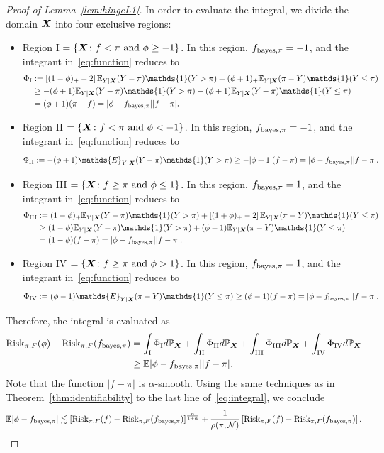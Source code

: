 \documentclass[11pt]{article}
\theoremstyle{plain}
\theoremstyle{definition}
\def\bayespif{f_{\textup{bayes},\pi}}
\def\riskF{\textup{Risk}_{\pi,F}}
\begin{document}
\begin{proof}[Proof of Lemma~\ref{lem:hingeL1}]
In order to evaluate the integral, we divide the domain $\bm X$ into four exclusive regions:
\begin{itemize}
\item Region I $= \{\bm X\colon f<\pi \text{ and }\phi\geq -1\}$. In this region, $\bayespif=-1$, and the integrant in~\eqref{eq:function} reduces to
\begin{align}
\Phi_{\textup{I}}&:=\left[(1-\phi)_{+}-2\right]\mathbb{E}_{Y|\mX}(Y- \pi)\mathds{1}(Y> \pi)+(\phi+1)_{+}\mathbb{E}_{Y|\mX}(\pi-Y)\mathds{1}(Y\leq \pi)\\
&\geq -(\phi+1)\mathbb{E}_{Y|\mX}(Y-\pi)\mathds{1}(Y>\pi)-(\phi+1)\mathbb{E}_{Y|\mX}(Y-\pi)\mathds{1}(Y\leq \pi)\\
&=(\phi+1)(\pi-f)=|\phi-\bayespif||f-\pi|.
\end{align}
\item Region II $= \{\bm X\colon f < \pi \text{ and }\phi<-1\}$. In this region, $\bayespif=-1$, and the integrant in~\eqref{eq:function} reduces to
\[
\Phi_{\textup{II}}:=-(\phi+1)\mathds{E}_{Y|\mX}(Y-\pi)\mathds{1}(Y>\pi)\geq-|\phi+1|(f-\pi) =|\phi-\bayespif||f-\pi|.
\]
\item Region III $=\{ \bm X\colon f\geq \pi \text{ and }\phi\leq 1\}$. In this region, $\bayespif=1$, and the integrant in~\eqref{eq:function} reduces to
\begin{align}
\Phi_{\textup{III}}&:=(1-\phi)_{+}\mathbb{E}_{Y|\mX}(Y-\pi)\mathds{1}(Y>\pi)+\left[(1+\phi)_{+}-2\right]\mathbb{E}_{Y|\mX}(\pi-Y)\mathds{1}(Y\leq \pi)\\
&\geq (1-\phi)\mathbb{E}_{Y|\mX}(Y-\pi)\mathds{1}(Y>\pi)+(\phi-1)\mathbb{E}_{Y|\mX}(\pi-Y)\mathds{1}(Y\leq \pi)\\
&=(1-\phi)(f-\pi)=|\phi-\bayespif||f-\pi|.
\end{align}
\item Region IV $=\{\bm X\colon f\geq \pi \text{ and }\phi> 1\}$. In this region, $\bayespif=1$, and the integrant in~\eqref{eq:function} reduces to
\[
\Phi_{\textup{IV}}:=(\phi-1)\mathds{E}_{Y|\mX}(\pi-Y)\mathds{1}(Y\leq \pi)\geq (\phi-1)(f-\pi) = |\phi-\bayespif||f-\pi|.
\]
\end{itemize}
Therefore, the integral is evaluated as
\begin{align}\label{eq:integral}
\riskF(\phi)-\riskF(\bayespif) &= \int_{\textup{I}}\Phi_{\textup{I}} d\mathbb{P}_{\mX}+\int_{\textup{II}}\Phi_{\textup{II}} d\mathbb{P}_{\mX}+\int_{\textup{III}}\Phi_{\textup{III}} d\mathbb{P}_{\mX}+\int_{\textup{IV}}\Phi_{\textup{IV}} d\mathbb{P}_{\mX}\notag\\
&\geq \mathbb{E}|\phi-\bayespif||f-\pi|.
\end{align}
Note that the function $|f-\pi|$ is $\alpha$-smooth. Using the same techniques as in Theorem~\ref{thm:identifiability} to the last line of~\eqref{eq:integral}, we conclude
\begin{equation}
\mathbb{E}|\phi-\bayespif|
\lesssim
\left[\riskF(f)-\riskF(\bayespif)\right]^{\alpha\over 1+\alpha}+
 {1\over \rho(\pi, \tN)}\left[\riskF(f)-\riskF(\bayespif)\right].
\end{equation}
\end{proof}
\end{document}
